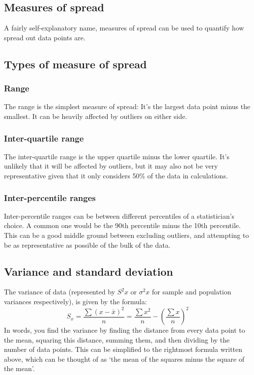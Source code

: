 \subsection{Measures of spread}
A fairly self-explanatory name, measures of spread can be used to quantify how spread out data points are.
\subsection{Types of measure of spread}
\subsubsection{Range}
The range is the simplest measure of spread: It's the largest data point minus the smallest. It can be heavily affected by outliers on either side.

\subsubsection{Inter-quartile range}
The inter-quartile range is the upper quartile minus the lower quartile. It's unlikely that it will be affected by outliers, but it may also not be very representative given that it only considers 50\% of the data in calculations.

\subsubsection{Inter-percentile ranges}
Inter-percentile ranges can be between different percentiles of a statistician's choice. A common one would be the 90th percentile minus the 10th percentile. This can be a good middle ground between excluding outliers, and attempting to be as representative as possible of the bulk of the data.

\subsection{Variance and standard deviation}
The variance of data (represented by $S^2x$ or $\sigma^2x$ for sample and population variances respectively), is given by the formula:
\begin{equation}
	S_x = \frac{\sum{(x-\bar{x})^2}}{n}=\frac{\sum{x^2}}{n}-\left(\frac{\sum{x}}{n}\right)^2
\end{equation}
In words, you find the variance by finding the distance from every data point to the mean, squaring this distance, summing them, and then dividing by the number of data points. This can be simplified to the rightmost formula written above, which can be thought of as `the mean of the squares minus the square of the mean'.

